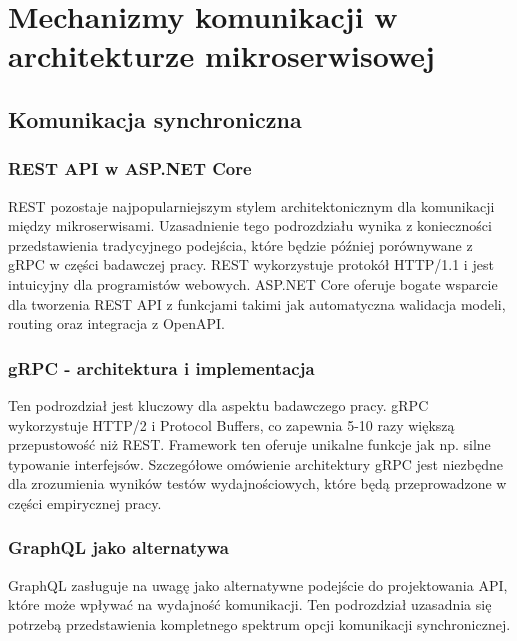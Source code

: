 \cleardoublepage

\chapter{Mechanizmy komunikacji w architekturze mikroserwisowej}
\label{cha:MechanizmyKomunikacji}

\section{Komunikacja synchroniczna}
\label{sec:KomunikacjaSynchroniczna}

\subsection{REST API w ASP.NET Core}
\label{subsec:RESTAPI}

REST pozostaje najpopularniejszym stylem architektonicznym dla komunikacji między mikroserwisami. Uzasadnienie tego podrozdziału wynika z konieczności przedstawienia tradycyjnego podejścia, które będzie później porównywane z gRPC w części badawczej pracy. REST wykorzystuje protokół HTTP/1.1 i jest intuicyjny dla programistów webowych. ASP.NET Core oferuje bogate wsparcie dla tworzenia REST API z funkcjami takimi jak automatyczna walidacja modeli, routing oraz integracja z OpenAPI.

\subsection{gRPC - architektura i implementacja}
\label{subsec:gRPC}

Ten podrozdział jest kluczowy dla aspektu badawczego pracy. gRPC wykorzystuje HTTP/2 i Protocol Buffers, co zapewnia 5-10 razy większą przepustowość niż REST. Framework ten oferuje unikalne funkcje jak np. silne typowanie interfejsów. Szczegółowe omówienie architektury gRPC jest niezbędne dla zrozumienia wyników testów wydajnościowych, które będą przeprowadzone w części empirycznej pracy.

\subsection{GraphQL jako alternatywa}
\label{subsec:GraphQL}

GraphQL zasługuje na uwagę jako alternatywne podejście do projektowania API, które może wpływać na wydajność komunikacji. Ten podrozdział uzasadnia się potrzebą przedstawienia kompletnego spektrum opcji komunikacji synchronicznej.

